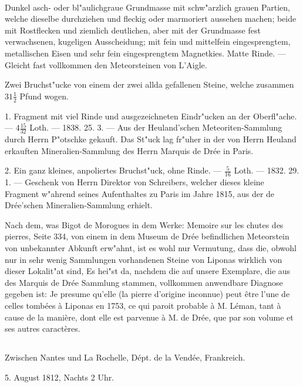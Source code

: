 \documentclass[a4paper, 11pt, oneside, polutonikogreek, german]{article}
\begin{document}
\paragraph{}
Dunkel asch- oder bl"aulichgraue Grundmasse mit schw"arzlich grauen Partien, welche dieselbe durchziehen und fleckig oder marmoriert aussehen machen; beide mit Rostflecken und ziemlich deutlichen, aber mit der Grundmasse fest verwachsenen, kugeligen Ausscheidung; mit fein und mittelfein eingesprengtem, metallischen Eisen und sehr fein eingesprengtem Magnetkies. Matte Rinde. --- Gleicht fast vollkommen den Meteorsteinen von L'Aigle.

Zwei Bruchst"ucke von einem der zwei allda gefallenen Steine, welche zusammen $\mathfrak{31\frac{1}{2}}$ Pfund wogen.

1. Fragment mit viel Rinde und ausgezeichneten Eindr"ucken an der Oberfl"ache. --- $\mathfrak{4\frac{15}{32}}$ Loth. --- 1838. 25. 3. --- Aus der Heuland'schen Meteoriten-Sammlung durch Herrn P"otschke gekauft. Das St"uck lag fr"uher in der von Herrn Heuland erkauften Mineralien-Sammlung des Herrn Marquis de Drée in Paris.

2. Ein ganz kleines, anpoliertes Bruchst"uck, ohne Rinde. --- $\mathfrak{\frac{5}{16}}$ Loth. --- 1832. 29. 1. --- Geschenk von Herrn Direktor von Schreibers, welcher dieses kleine Fragment w"ahrend seines Aufenthaltes zu Paris im Jahre 1815, aus der de Drée'schen Mineralien-Sammlung erhielt.

\setlength{\leftskip}{10mm}
\setlength{\parindent}{0pt}

{\footnotesize Nach dem, was Bigot de Morogues in dem Werke: Memoire sur les chutes des pierres, Seite 334, von einem in dem Museum de Drée befindlichen Meteorstein von unbekannter Abkunft erw"ahnt, ist es wohl nur Vermutung, dass die, obwohl nur in sehr wenig Sammlungen vorhandenen Steine von Liponas wirklich von dieser Lokalit"at sind, Es hei"st da, nachdem die auf unsere Exemplare, die aus des Marquis de Drée Sammlung stammen, vollkommen anwendbare Diagnose gegeben ist: Je presume qu'elle (la pierre d'origine inconnue) peut être l'une de celles tombées à Liponas en 1753, ce qui paroit probable à M. Léman, tant à cause de la manière, dont elle est parvenue à M. de Drée, que par son volume et ses autres caractères.}

\setlength{\leftskip}{0pt}
\setlength{\parindent}{20pt}

\subsection{}
\begin{center}

Zwischen Nantes und La Rochelle, Dépt. de la Vendée, Frankreich.

5. August 1812, Nachts 2 Uhr.
\end{center}
\end{document}
